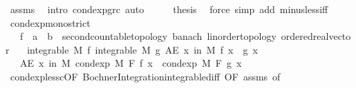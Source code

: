 \begin{isabellebody}
\ assms\ \isamarkupfalse%
\ {\isacharparenleft}{\kern0pt}intro\ cond{\isacharunderscore}{\kern0pt}exp{\isacharunderscore}{\kern0pt}gr{\isacharunderscore}{\kern0pt}c{\isacharparenright}{\kern0pt}\ auto\isanewline
\ \ \isamarkupfalse%
\ \isamarkupfalse%
\ {\isacharquery}{\kern0pt}thesis\ \isamarkupfalse%
\ {\isacharparenleft}{\kern0pt}force\ simp\ add{\isacharcolon}{\kern0pt}\ minus{\isacharunderscore}{\kern0pt}less{\isacharunderscore}{\kern0pt}iff{\isacharparenright}{\kern0pt}\isanewline
{}\isamarkupfalse%
%
\endisatagproof
{\isafoldproof}%
%
\isadelimproof
\isanewline
%
\endisadelimproof
\isanewline
{}\isamarkupfalse%
\ cond{\isacharunderscore}{\kern0pt}exp{\isacharunderscore}{\kern0pt}mono{\isacharunderscore}{\kern0pt}strict{\isacharcolon}{\kern0pt}\isanewline
\ \ \ f\ {\isacharcolon}{\kern0pt}{\isacharcolon}{\kern0pt}\ {\isachardoublequoteopen}{\isacharprime}{\kern0pt}a\ {\isasymRightarrow}\ {\isacharprime}{\kern0pt}b\ {\isacharcolon}{\kern0pt}{\isacharcolon}{\kern0pt}\ {\isacharbraceleft}{\kern0pt}second{\isacharunderscore}{\kern0pt}countable{\isacharunderscore}{\kern0pt}topology{\isacharcomma}{\kern0pt}\ banach{\isacharcomma}{\kern0pt}\ linorder{\isacharunderscore}{\kern0pt}topology{\isacharcomma}{\kern0pt}\ ordered{\isacharunderscore}{\kern0pt}real{\isacharunderscore}{\kern0pt}vector{\isacharbraceright}{\kern0pt}{\isachardoublequoteclose}\isanewline
\ \ \ {\isachardoublequoteopen}integrable\ M\ f{\isachardoublequoteclose}\ {\isachardoublequoteopen}integrable\ M\ g{\isachardoublequoteclose}\ {\isachardoublequoteopen}AE\ x\ in\ M{\isachardot}{\kern0pt}\ f\ x\ {\isacharless}{\kern0pt}\ g\ x{\isachardoublequoteclose}\isanewline
\ \ \ {\isachardoublequoteopen}AE\ x\ in\ M{\isachardot}{\kern0pt}\ cond{\isacharunderscore}{\kern0pt}exp\ M\ F\ f\ x\ {\isacharless}{\kern0pt}\ cond{\isacharunderscore}{\kern0pt}exp\ M\ F\ g\ x{\isachardoublequoteclose}\isanewline
%
\isadelimproof
\ \ %
\endisadelimproof
%
\isatagproof
{}\isamarkupfalse%
\ cond{\isacharunderscore}{\kern0pt}exp{\isacharunderscore}{\kern0pt}less{\isacharunderscore}{\kern0pt}c{\isacharbrackleft}{\kern0pt}OF\ Bochner{\isacharunderscore}{\kern0pt}Integration{\isachardot}{\kern0pt}integrable{\isacharunderscore}{\kern0pt}diff{\isacharcomma}{\kern0pt}\ OF\ assms{\isacharparenleft}{\kern0pt}{}{\isacharcomma}{\kern0pt}{}{\isacharparenright}{\kern0pt}{\isacharcomma}{\kern0pt}\ of\ {}{\isacharbrackright}{\kern0pt}\ \isanewline

\end{isabellebody}
